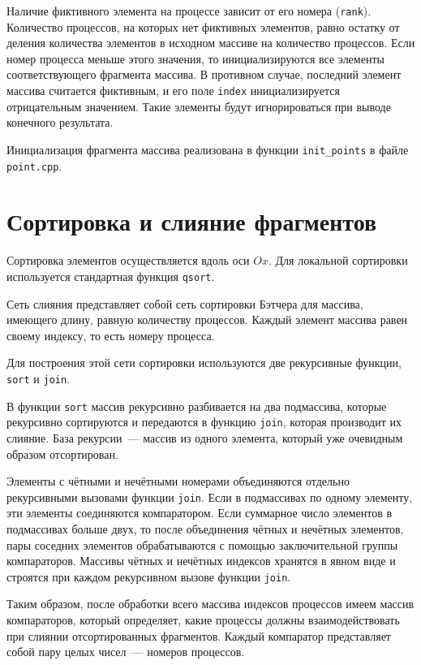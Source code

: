 \documentclass[oneside,final,14pt]{extreport}
\begin{document}
Наличие фиктивного элемента на процессе зависит от его номера (\texttt{rank}).
Количество процессов, на которых нет фиктивных элементов, равно остатку от
деления количества элементов в исходном массиве на количество процессов.
Если номер процесса меньше этого значения, то инициализируются все элементы
соответствующего фрагмента массива. В противном случае, последний элемент
массива считается фиктивным, и его поле \texttt{index} инициализируется
отрицательным значением. Такие элементы будут игнорироваться при выводе
конечного результата.

Инициализация фрагмента массива реализована в функции
\texttt{init\_points} в файле \texttt{point.cpp}.

\section*{Сортировка и слияние фрагментов}

Сортировка элементов осуществляется вдоль оси $Ox$. Для локальной
сортировки используется стандартная функция \texttt{qsort}.

Сеть слияния представляет собой сеть сортировки Бэтчера для массива, имеющего
длину, равную количеству процессов. Каждый элемент массива равен своему индексу,
то есть номеру процесса.

Для построения этой сети сортировки используются две рекурсивные функции,
\texttt{sort} и \texttt{join}.

В функции \texttt{sort} массив рекурсивно разбивается на два подмассива,
которые рекурсивно сортируются и передаются в функцию \texttt{join}, которая
производит их слияние. База рекурсии~--- массив из одного элемента,
который уже очевидным образом отсортирован.

Элементы с чётными и нечётными номерами объединяются отдельно рекурсивными
вызовами функции \texttt{join}. Если в подмассивах по одному элементу,
эти элементы соединяются компаратором. Если суммарное число элементов в
подмассивах больше двух, то после объединения чётных и нечётных элементов,
пары соседних элементов обрабатываются с помощью заключительной
группы компараторов. Массивы чётных и нечётных индексов хранятся в явном виде
и строятся при каждом рекурсивном вызове функции \texttt{join}.

Таким образом, после обработки всего массива индексов процессов имеем
массив компараторов, который определяет, какие процессы должны взаимодействовать
при слиянии отсортированных фрагментов. Каждый компаратор представляет собой
пару целых чисел~--- номеров процессов.
\end{document}
